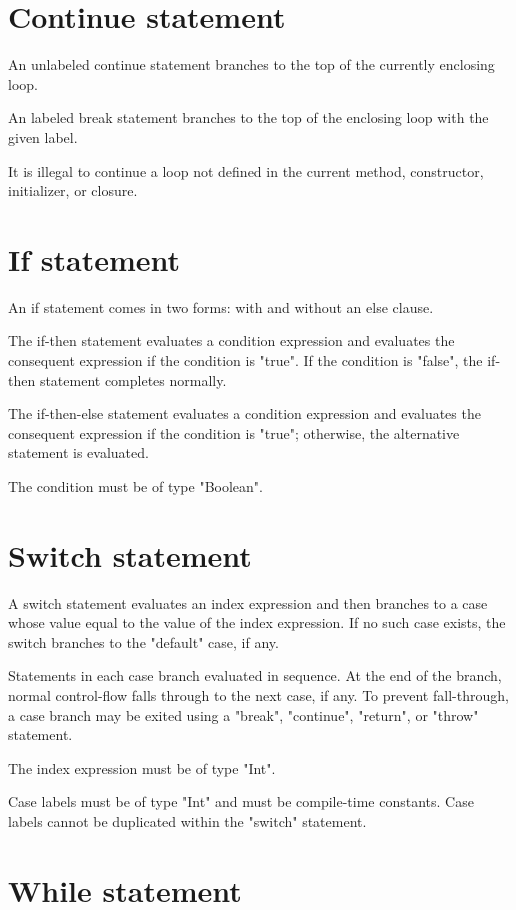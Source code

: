 \section{Continue statement}

An unlabeled continue statement branches to the top of the
currently enclosing loop.

An labeled break statement branches to the top of the enclosing loop
with the given label.

It is illegal to continue a loop not defined in the current
method, constructor, initializer, or closure.

\section{If statement}

An if statement comes in two forms: with and without an else
clause.

The if-then statement evaluates a condition expression and 
evaluates the consequent expression if the condition is
\xcd"true".  If the 
condition is \xcd"false",
the if-then statement completes normally.

The if-then-else statement evaluates a condition expression and 
evaluates the consequent expression if the condition is
\xcd"true"; otherwise, the alternative statement is evaluated.

The condition must be of type \xcd"Boolean".

\section{Switch statement}

A switch statement evaluates an index expression and then branches to
a case whose value equal to the value of the index expression.
If no such case exists, the switch branches to the 
\xcd"default" case, if any.

Statements in each case branch evaluated in sequence.  At the
end of the branch, normal control-flow falls through to the next case, if
any.  To prevent fall-through, a case branch may be exited using a \xcd"break",
\xcd"continue", \xcd"return", or \xcd"throw" statement.

The index expression must be of type \xcd"Int".

Case labels must be of type \xcd"Int" and must be compile-time
constants.  Case labels cannot be duplicated within the
\xcd"switch" statement.

\section{While statement}

